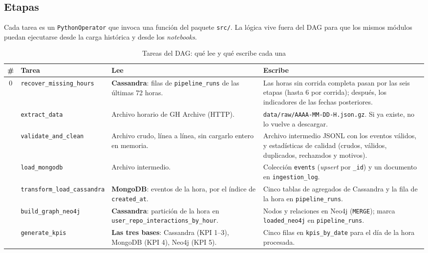 \subsection{Etapas}

Cada tarea es un \texttt{PythonOperator} que invoca una función del paquete \texttt{src/}. La lógica vive fuera del DAG para que los mismos módulos puedan ejecutarse desde la carga histórica y desde los \textit{notebooks}.

\begin{table}[H]
\centering
\caption{Tareas del DAG: qué lee y qué escribe cada una}
\label{tab:etapas}
\vspace{0.2cm}
\footnotesize
\begin{tabular}{@{}cp{3.3cm}p{4.9cm}p{5.4cm}@{}}
\toprule
\textbf{\#} & \textbf{Tarea} & \textbf{Lee} & \textbf{Escribe} \\
\midrule
0 & \texttt{recover\_\bk{}missing\_hours} &
\textbf{Cassandra}: filas de \texttt{pipeline\_runs} de las últimas 72 horas. &
Las horas sin corrida completa pasan por las seis etapas (hasta 6 por corrida); después, los indicadores de las fechas posteriores. \\
\addlinespace
1 & \texttt{extract\_data} &
Archivo horario de GH Archive (HTTP). &
\texttt{data/raw/AAAA-MM-DD-H.json.gz}. Si ya existe, no lo vuelve a descargar. \\
\addlinespace
2 & \texttt{validate\_and\_clean} &
Archivo crudo, línea a línea, sin cargarlo entero en memoria. &
Archivo intermedio JSONL con los eventos válidos, y estadísticas de calidad (crudos, válidos, duplicados, rechazados y motivos). \\
\addlinespace
3 & \texttt{load\_mongodb} &
Archivo intermedio. &
Colección \texttt{events} (\textit{upsert} por \texttt{\_id}) y un documento en \texttt{ingestion\_log}. \\
\addlinespace
4 & \texttt{transform\_load\_\bk{}cassandra} &
\textbf{MongoDB}: eventos de la hora, por el índice de \texttt{created\_at}. &
Cinco tablas de agregados de Cassandra y la fila de la hora en \texttt{pipeline\_runs}. \\
\addlinespace
5 & \texttt{build\_graph\_neo4j} &
\textbf{Cassandra}: partición de la hora en \texttt{user\_repo\_\bk{}interactions\_\bk{}by\_hour}. &
Nodos y relaciones en Neo4j (\texttt{MERGE}); marca \texttt{loaded\_neo4j} en \texttt{pipeline\_runs}. \\
\addlinespace
6 & \texttt{generate\_kpis} &
\textbf{Las tres bases}: Cassandra (KPI 1--3), MongoDB (KPI 4), Neo4j (KPI 5). &
Cinco filas en \texttt{kpis\_by\_date} para el día de la hora procesada. \\
\bottomrule
\end{tabular}
\end{table}


